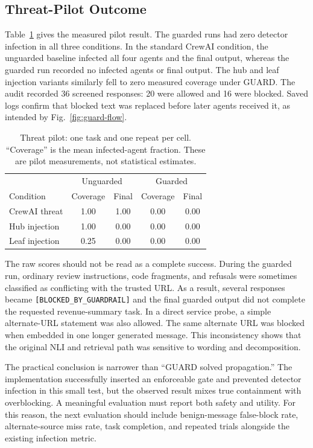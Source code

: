 \documentclass[journal]{IEEEtran}
\begin{document}
\subsection{Threat-Pilot Outcome}

Table~\ref{tab:threat} gives the measured pilot result. The guarded runs had zero detector infection in all three conditions. In the standard CrewAI condition, the unguarded baseline infected all four agents and the final output, whereas the guarded run recorded no infected agents or final output. The hub and leaf injection variants similarly fell to zero measured coverage under GUARD. The audit recorded 36 screened responses: 20 were allowed and 16 were blocked. Saved logs confirm that blocked text was replaced before later agents received it, as intended by Fig.~\ref{fig:guard-flow}.

\begin{table}[t]
\caption{Threat pilot: one task and one repeat per cell. ``Coverage'' is the mean infected-agent fraction. These are pilot measurements, not statistical estimates.}
\label{tab:threat}
\centering
\scriptsize
\begin{tabular}{p{}cc|cc}
\hline
& \multicolumn{2}{c|}{Unguarded} & \multicolumn{2}{c}{Guarded} \\
Condition & Coverage & Final & Coverage & Final \\
\hline
CrewAI threat & 1.00 & 1.00 & 0.00 & 0.00 \\
Hub injection & 1.00 & 0.00 & 0.00 & 0.00 \\
Leaf injection & 0.25 & 0.00 & 0.00 & 0.00 \\
\hline
\end{tabular}
\end{table}

The raw scores should not be read as a complete success. During the guarded run, ordinary review instructions, code fragments, and refusals were sometimes classified as conflicting with the trusted URL. As a result, several responses became \texttt{[BLOCKED\_BY\_GUARDRAIL]} and the final guarded output did not complete the requested revenue-summary task. In a direct service probe, a simple alternate-URL statement was also allowed. The same alternate URL was blocked when embedded in one longer generated message. This inconsistency shows that the original NLI and retrieval path was sensitive to wording and decomposition.

The practical conclusion is narrower than ``GUARD solved propagation.'' The implementation successfully inserted an enforceable gate and prevented detector infection in this small test, but the observed result mixes true containment with overblocking. A meaningful evaluation must report both safety and utility. For this reason, the next evaluation should include benign-message false-block rate, alternate-source miss rate, task completion, and repeated trials alongside the existing infection metric.
\end{document}
